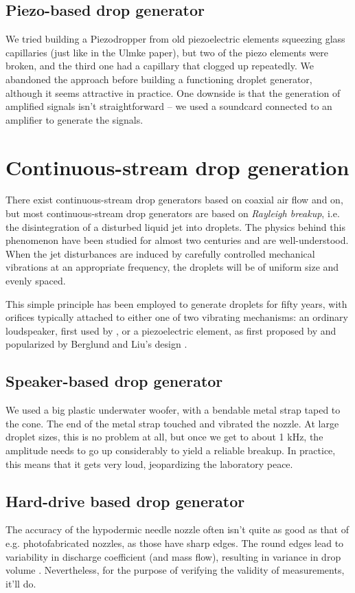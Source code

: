 \documentclass[11.5pt]{book}
\begin{document}
\subsection{Piezo-based drop generator}
We tried building a Piezodropper from old piezoelectric elements squeezing glass
capillaries (just like in the Ulmke paper), but two of the piezo elements were
broken, and the third one had a capillary that clogged up repeatedly. We
abandoned the approach before building a functioning droplet generator, although
it seems attractive in practice. One downside is that the generation of
amplified signals isn't straightforward -- we used a soundcard connected to an
amplifier to generate the signals.

\section{Continuous-stream drop generation}
There exist continuous-stream drop generators based on coaxial air flow
\cite{Green89} and on,
but most continuous-stream drop generators are based on
\emph{Rayleigh breakup}, i.e. the disintegration of a disturbed liquid jet into
droplets. The physics behind this phenomenon have been studied for almost two
centuries \cite{Savart33, Rayleigh79} and are well-understood. When the jet
disturbances are induced by carefully controlled mechanical vibrations at an
appropriate frequency, the droplets will be of uniform size and evenly spaced.

This simple principle has been employed to generate droplets for fifty years,
with orifices typically attached to either one of two vibrating mechanisms: an
ordinary loudspeaker, first used by \citet{Donnelly66}, or
a piezoelectric element, as first proposed by \citet{Schneider64} and popularized by Berglund and Liu's
design \cite{Berglund73}.

\subsection{Speaker-based drop generator}
We used a big plastic underwater woofer, with a bendable metal strap taped to
the cone. The end of the metal strap touched and vibrated the nozzle. At large
droplet sizes, this is no problem at all, but once we get to about 1 kHz, the
amplitude needs to go up considerably to yield a reliable breakup. In practice,
this means that it gets very loud, jeopardizing the laboratory peace.

\subsection{Hard-drive based drop generator}
The accuracy of the hypodermic needle nozzle often isn't quite as good as that of e.g.
photofabricated nozzles, as those have sharp edges. The round edges lead to
variability in discharge coefficient (and mass flow), resulting in variance in
drop volume \cite{Dressler90}. Nevertheless, for the purpose of verifying the validity of
measurements, it'll do.
\end{document}
